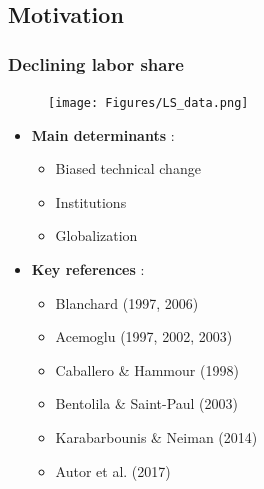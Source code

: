 \documentclass{beamer}
\begin{document}
		\subsection{Motivation}
			\begin{frame}\frametitle{Declining labor share}
			\begin{adjustwidth}{-1em}{-2em}
				\begin{minipage}[h]{.49\textwidth}
					\begin{figure}[h]
						\texttt{[image: Figures/LS\_data.png]}
					\end{figure}
				\end{minipage}
				\begin{minipage}[h]{.49\textwidth}
				\begin{adjustwidth}{0em}{-2em}
					\begin{itemize}
						\item \textbf{Main determinants} :
						\begin{itemize}
							\item Biased technical change
							\item Institutions
							\item Globalization
						\end{itemize}
					\vspace{1em}
						\item \textbf{Key references} :
						\begin{itemize}
							\footnotesize
							\item Blanchard (1997, 2006)
							\item Acemoglu (1997, 2002, 2003)
							\item Caballero \& Hammour (1998)
							\item Bentolila \& Saint-Paul (2003)
							\item Karabarbounis \& Neiman (2014)
							\item Autor et al. (2017)
						\end{itemize}
					\end{itemize}
				\end{adjustwidth}
				\end{minipage}
			\end{adjustwidth}
			\end{frame}
\end{document}
